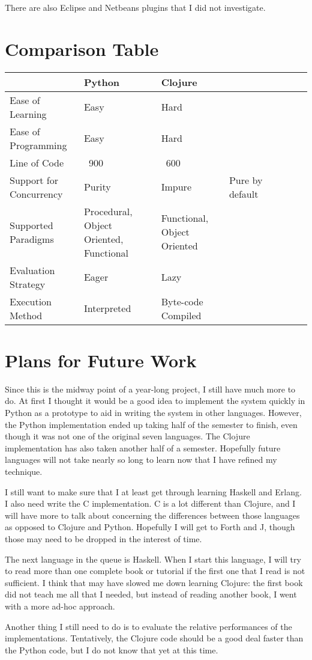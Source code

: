 \documentclass{article}
\begin{document}
There are also Eclipse and Netbeans plugins that I did not investigate.

\section{Comparison Table}


\begin{tabular}{l*{6}{l}l}
                        & Python & Clojure \\
    \hline
    Ease of Learning    & Easy & Hard \\
    Ease of Programming & Easy & Hard \\
    Line of Code        & ~900 & ~600 \\
    Support for Concurrency & 
    Purity              & Impure & Pure by default \\
    Supported Paradigms & Procedural, Object Oriented, Functional & Functional, Object Oriented \\
    Evaluation Strategy & Eager & Lazy \\
    Execution Method    & Interpreted & Byte-code Compiled \\
\end{tabular}

\section{Plans for Future Work}

Since this is the midway point of a year-long project, I still have much more to do.  At first I thought it would be a good idea to implement the system quickly in Python as a prototype to aid in writing the system in other languages.  However, the Python implementation ended up taking half of the semester to finish, even though it was not one of the original seven languages.  The Clojure implementation has also taken another half of a semester.  Hopefully future languages will not take nearly so long to learn now that I have refined my technique.

I still want to make sure that I at least get through learning Haskell and Erlang.  I also need write the C implementation.  C is a lot different than Clojure, and I will have more to talk about concerning the differences between those languages as opposed to Clojure and Python.  Hopefully I will get to Forth and J, though those may need to be dropped in the interest of time.

The next language in the queue is Haskell.  When I start this language, I will try to read more than one complete book or tutorial if the first one that I read is not sufficient.  I think that may have slowed me down learning Clojure: the first book did not teach me all that I needed, but instead of reading another book, I went with a more ad-hoc approach.

Another thing I still need to do is to evaluate the relative performances of the implementations.  Tentatively, the Clojure code should be a good deal faster than the Python code, but I do not know that yet at this time.



\end{document}
